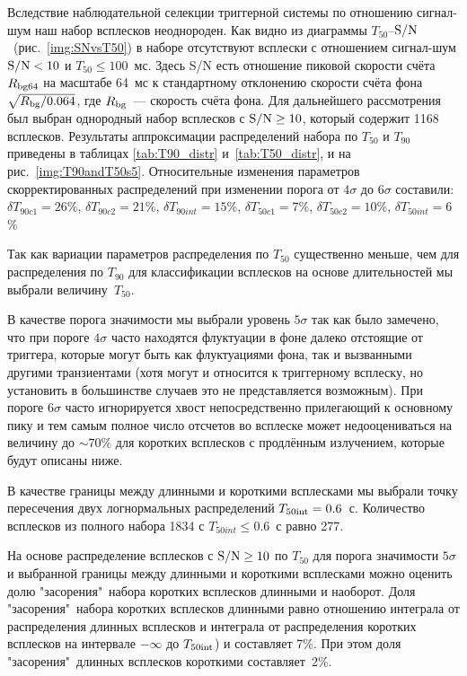 Вследствие наблюдательной селекции триггерной системы по отношению сигнал-шум 
наш набор всплесков неоднороден. Как видно из диаграммы $T_{50}$--${\mathrm{S/N}}$~(рис.~\ref{img:SNvsT50}) 
в наборе отсутствуют всплески с отношением сигнал-шум ${\mathrm{S/N}} < 10$ и $T_{50} \leq 100$~мс. 
Здесь S/N есть отношение пиковой скорости счёта $R_{{\mathrm{bg}}64}$ на масштабе 64~мс 
к стандартному отклонению скорости счёта фона $\sqrt{R_{{\mathrm{bg}}}/0.064}$, 
где $R_{{\mathrm{bg}}}$~--- скорость счёта фона. Для дальнейшего рассмотрения был выбран 
однородный набор всплесков с ${\mathrm{S/N}}\geq 10$, который содержит 1168 всплесков. 
Результаты аппроксимации распределений набора по $T_{50}$ и $T_{90}$ приведены в 
таблицах \ref{tab:T90_distr} и~\ref{tab:T50_distr}, и на рис.~\ref{img:T90andT50s5}. 
Относительные изменения параметров скорректированных распределений при изменении 
порога от $4\sigma$ до $6\sigma$ составили: 
$\delta T_{90c1} = 26$\%, $\delta T_{90c2} = 21$\%, $\delta T_{90int} = 15$\%, 
$\delta T_{50c1} = 7$\%, $\delta T_{50c2} = 10$\%, $\delta T_{50int} = 6$\%

Так как вариации параметров распределения по $T_{50}$ существенно меньше, 
чем для распределения по $T_{90}$ для классификации всплесков на основе длительностей 
мы выбрали величину~$T_{50}$. 

В качестве порога значимости мы выбрали уровень $5\sigma$ так как было замечено, 
что при пороге $4\sigma$ часто находятся флуктуации в фоне далеко отстоящие от 
триггера, которые могут быть как флуктуациями фона, так и вызванными другими 
транзиентами (хотя могут и относится к триггерному всплеску, но установить в 
большинстве случаев это не представляется возможным). При пороге $6\sigma$ часто 
игнорируется хвост непосредственно прилегающий к основному пику и тем самым полное 
число отсчетов во всплеске может недооцениваться на величину до $\sim 70$\% 
для коротких всплесков с продлённым излучением, которые будут описаны ниже.

В качестве границы между длинными и короткими всплесками мы выбрали точку пересечения 
двух логнормальных распределений $T_{50{\mathrm{int}}} = 0.6$~с. Количество всплесков из полного 
набора 1834 с $T_{50int} \leq 0.6$~с равно 277. 

На основе распределение всплесков с ${\mathrm{S/N}}\geq 10$ по $T_{50}$ для порога 
значимости $5\sigma$ и выбранной границы между длинными и короткими всплесками 
можно оценить долю "засорения"\ набора коротких всплесков длинными и наоборот. 
Доля "засорения"\ набора коротких всплесков длинными равно отношению интеграла 
от распределения длинных всплесков и интеграла от распределения коротких всплесков 
на интервале $-\infty$ до $T_{50{\mathrm{int}}}$) и составляет 7\%. При этом доля "засорения"\ 
длинных всплесков короткими составляет~2\%.

